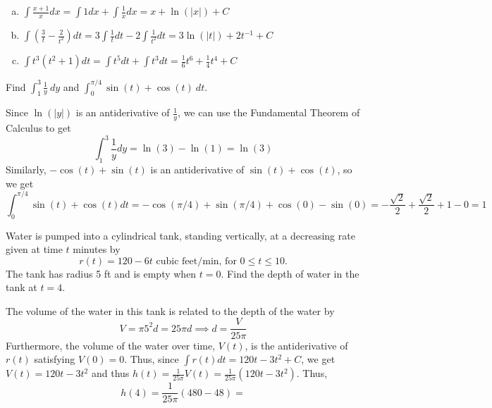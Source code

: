 \documentclass[11pt]{exam}
\begin{document}
\begin{questions}
    \begin{solution}
      \begin{enumerate}[(a)]
      \item \(\int \frac{x+1}{x} dx = \int 1 dx + \int \frac{1}{x} dx
        = x + \ln(|x|) + C\)
      \item \(\int \left( \frac{3}{t} - \frac{2}{t^2} \right)dt = 3 \int
        \frac{1}{t} dt - 2 \int \frac{1}{t^2} dt = 3 \ln(|t|) + 2
        t^{-1} + C\)
      \item \(\int t^3(t^2+1) dt = \int t^5 dt + \int t^3 dt =
        \frac{1}{6} t^6 + \frac{1}{4} t^4 + C\)
      \end{enumerate}
    \end{solution}
  \question Find $\displaystyle \int_1^3 \frac{1}{y} \ dy$ and $\displaystyle \int_0^{\pi/4} \sin(t)+\cos(t) \ dt$.
    \begin{solution}
      Since \(\ln(|y|)\) is an antiderivative of \(\frac{1}{y}\), we
      can use the Fundamental Theorem of Calculus to get \[
        \int_1^3 \frac{1}{y} dy = \ln(3)-\ln(1) = \ln(3)
      \]
      Similarly, \(-\cos(t) + \sin(t)\) is an antiderivative of
      \(\sin(t) + \cos(t)\), so we get \[
        \int_0^{\pi/4} \sin(t) + \cos(t) dt = -\cos(\pi/4)+\sin(\pi/4)
        +\cos(0)-\sin(0) = -\frac{\sqrt{2}}{2} + \frac{\sqrt{2}}{2} +1
        - 0 = 1
      \]
    \end{solution}
  \question Water is pumped into a cylindrical tank, standing
    vertically, at a decreasing rate given at time \(t\) minutes by \[
      r(t) = 120 - 6t \text{ cubic feet/min, for } 0 \leq t \leq 10.
    \]
    The tank has radius 5 ft and is empty when \(t=0\). Find the depth
    of water in the tank at \(t=4\).
    \begin{solution}
      The volume of the water in this tank is related to the depth of
      the water by \[
        V = \pi 5^2 d = 25 \pi d \implies d = \frac{V}{25 \pi}
      \]
      Furthermore, the volume of the water over time, \(V(t)\), is
      the antiderivative of \(r(t)\) satisfying \(V(0) = 0\). Thus,
      since \(\int r(t) dt = 120t-3t^2+C\), we get \(V(t) =
      120t-3t^2\) and thus \(h(t) = \frac{1}{25 \pi} V(t) =
      \frac{1}{25 \pi} \left( 120t - 3t^2 \right)\). Thus, \[
        h(4) = \frac{1}{25 \pi} \left( 480 - 48 \right) =
\]
\end{solution}
\end{questions}
\end{document}
